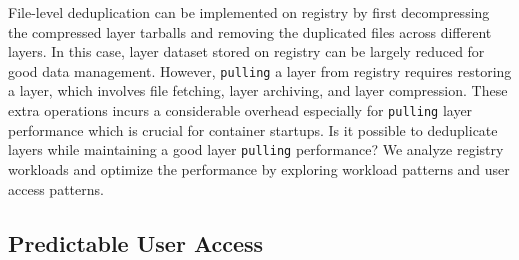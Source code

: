 File-level deduplication can be implemented on registry by first decompressing the compressed layer tarballs and 
removing the duplicated files across different layers.
In this case, 
layer dataset stored on registry can be largely reduced for good data management.
However,  
\texttt{pulling}
a layer from registry requires restoring a layer,
which involves file fetching, layer archiving, and layer compression.
These extra operations incurs a considerable overhead especially for  
\texttt{pulling} layer performance which is crucial for container startups. 
Is it possible to deduplicate layers while maintaining a good layer \texttt{pulling} performance?
We analyze registry workloads and 
optimize the performance by exploring workload patterns and user access patterns.   


\subsection{Predictable User Access}


